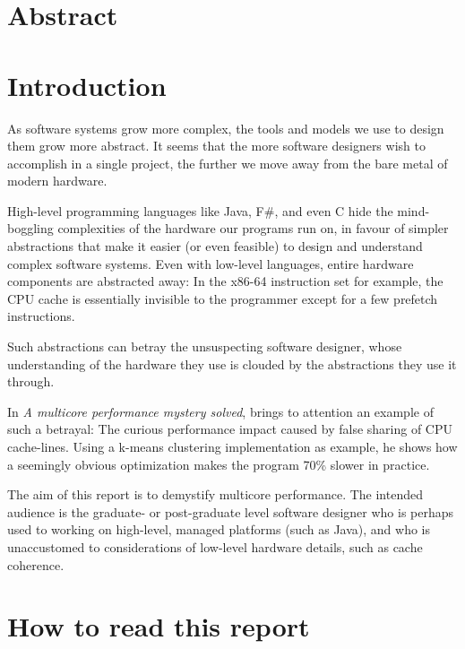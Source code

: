 \chapter{Abstract}

\chapter{Introduction}
As software systems grow more complex, the tools and models we use to design
them grow more abstract. It seems that the more software designers wish to
accomplish in a single project, the further we move away from the bare metal of
modern hardware.

High-level programming languages like Java, F\#, and even C hide the
mind-boggling complexities of the hardware our programs run on, in favour of
simpler abstractions that make it easier (or even feasible) to design and
understand complex software systems. Even with low-level languages, entire
hardware components are abstracted away: In the x86-64 instruction set for
example, the CPU cache is essentially invisible to the programmer except for a
few prefetch instructions.

Such abstractions can betray the unsuspecting software designer, whose
understanding of the hardware they use is clouded by the abstractions they use
it through.

In \textit{A multicore performance mystery solved}\cite{mystery},
\citeauthor{mystery} brings to attention an example of such a betrayal: The
curious performance impact caused by false sharing of CPU cache-lines. Using a
k-means clustering implementation as example, he shows how a seemingly obvious
optimization makes the program 70\% slower in practice.

The aim of this report is to demystify multicore performance.
The intended audience is the graduate- or post-graduate level software designer
who is perhaps used to working on high-level, managed platforms (such as Java),
and who is unaccustomed to considerations of low-level hardware details, such as
cache coherence.


\chapter{How to read this report}
